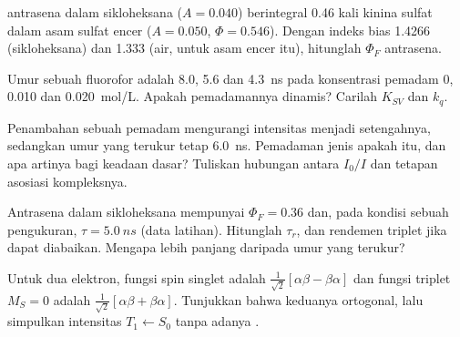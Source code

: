 \begin{exercise}[$\star\star$]\label{exo:b3:electronic-spectroscopy:8}
 antrasena dalam sikloheksana ($A = 0.040$) berintegral 0.46 kali
 kinina sulfat dalam asam sulfat encer ($A = 0.050$, $\Phi =
0.546$). Dengan indeks bias 1.4266 (sikloheksana) dan 1.333 (air, untuk asam
encer itu), hitunglah $\Phi_F$ antrasena.
\end{exercise}

\begin{exercise}[$\star\star$]\label{exo:b3:electronic-spectroscopy:9}
Umur sebuah fluorofor adalah 8.0, 5.6 dan \qty{4.3}{ns} pada konsentrasi
pemadam 0, 0.010 dan \qty{0.020}{mol/L}. Apakah pemadamannya dinamis? Carilah
$K_{SV}$ dan $k_q$.
\end{exercise}

\begin{exercise}[$\star\star\star$]\label{exo:b3:electronic-spectroscopy:10}
Penambahan sebuah pemadam mengurangi intensitas  menjadi
setengahnya, sedangkan umur yang terukur tetap \qty{6.0}{ns}. Pemadaman jenis
apakah itu, dan apa artinya bagi keadaan dasar? Tuliskan hubungan antara
$I_0/I$ dan tetapan asosiasi kompleksnya.
\end{exercise}

\begin{exercise}[$\star\star\star$]\label{exo:b3:electronic-spectroscopy:11}
Antrasena dalam sikloheksana mempunyai $\Phi_F = 0.36$ dan, pada kondisi
sebuah pengukuran, $\tau = \qty{5.0}{ns}$ (data latihan). Hitunglah $\tau_r$,
dan rendemen triplet jika  dapat diabaikan. Mengapa  lebih panjang daripada umur yang terukur?
\end{exercise}

\begin{exercise}[$\star\star\star$]\label{exo:b3:electronic-spectroscopy:12}
Untuk dua elektron, fungsi spin singlet adalah
$\frac{1}{\sqrt2}[\alpha\beta - \beta\alpha]$ dan fungsi triplet $M_S = 0$ adalah
$\frac{1}{\sqrt2}[\alpha\beta + \beta\alpha]$. Tunjukkan bahwa keduanya ortogonal,
lalu simpulkan intensitas $T_1 \leftarrow S_0$ tanpa adanya .
\end{exercise}

